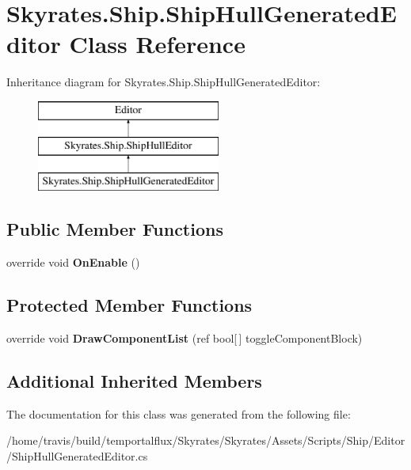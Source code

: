 \hypertarget{class_skyrates_1_1_ship_1_1_ship_hull_generated_editor}{\section{Skyrates.\-Ship.\-Ship\-Hull\-Generated\-Editor Class Reference}
\label{class_skyrates_1_1_ship_1_1_ship_hull_generated_editor}
}
Inheritance diagram for Skyrates.\-Ship.\-Ship\-Hull\-Generated\-Editor\-:\begin{figure}[H]
\begin{center}
\leavevmode
\includegraphics[height=3.000000cm]{class_skyrates_1_1_ship_1_1_ship_hull_generated_editor}
\end{center}
\end{figure}
\subsection*{Public Member Functions}
\begin{DoxyCompactItemize}
\item 
\hypertarget{class_skyrates_1_1_ship_1_1_ship_hull_generated_editor_a3525478dd9412b1ffbabeae96a67bd99}{override void {\bfseries On\-Enable} ()}\label{class_skyrates_1_1_ship_1_1_ship_hull_generated_editor_a3525478dd9412b1ffbabeae96a67bd99}

\end{DoxyCompactItemize}
\subsection*{Protected Member Functions}
\begin{DoxyCompactItemize}
\item 
\hypertarget{class_skyrates_1_1_ship_1_1_ship_hull_generated_editor_a4653d1ce9e6e43cd4f90e59c5aef08e8}{override void {\bfseries Draw\-Component\-List} (ref bool\mbox{[}$\,$\mbox{]} toggle\-Component\-Block)}\label{class_skyrates_1_1_ship_1_1_ship_hull_generated_editor_a4653d1ce9e6e43cd4f90e59c5aef08e8}

\end{DoxyCompactItemize}
\subsection*{Additional Inherited Members}


The documentation for this class was generated from the following file\-:\begin{DoxyCompactItemize}
\item 
/home/travis/build/temportalflux/\-Skyrates/\-Skyrates/\-Assets/\-Scripts/\-Ship/\-Editor/Ship\-Hull\-Generated\-Editor.\-cs\end{DoxyCompactItemize}
